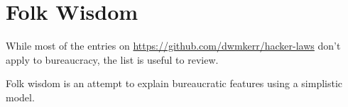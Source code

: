 \section{Folk Wisdom}
While most of the entries on
 \href{https://github.com/dwmkerr/hacker-laws}{https://github.com/dwmkerr/hacker-laws}
don't apply to bureaucracy, the list is useful to review. 


Folk wisdom is an attempt to explain bureaucratic features using a simplistic model.
